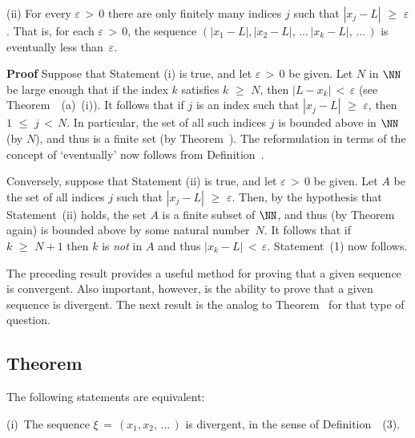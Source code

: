 \V

        (ii) For every ${\varepsilon}\,>\,0$ there are only finitely many indices $j$ such that $|x_{j}-L|\,\,{\geq}\,\,{\varepsilon}$.
    That is, for each ${\varepsilon}\,>\,0$, the sequence $(|x_{1}-L|, |x_{2}-L|, \,{\ldots}\,|x_{k}-L|,\,{\ldots}\,)$ is eventually less than~${\varepsilon}$.

    
\V

        {\bf Proof} Suppose that Statement (i) is true, and let ${\varepsilon}\,>\,0$ be given.
    Let $N$ in ${\NN}$ be large enough that if the index $k$ satisfies $k\,\,{\geq}\,\,N$, then $|L-x_{k}|\,<\,{\varepsilon}$ (see Theorem~~(a)~(i)).
    It follows that if $j$ is an index such that $|x_{j}-L|\,\,{\geq}\,\,{\varepsilon}$, then $1\,\,{\leq}\,\,j\,<\,N$.
    In particular, the set of all such indices $j$ is bounded above in ${\NN}$ (by $N$), and thus is a finite set (by Theorem~).
    The reformulation in terms of the concept of `eventually' now follows from Definition~.

        Conversely, suppose that Statement (ii) is true, and let ${\varepsilon}\,>\,0$ be given.
    Let $A$ be the set of all indices $j$ such that $|x_{j}-L|\,\,{\geq}\,\,{\varepsilon}$.
    Then, by the hypothesis that Statement~(ii) holds, the set $A$ is a finite subset of ${\NN}$,
    and thus (by Theorem~ again) is bounded above by some natural number~$N$.
    It follows that if $k\,\,{\geq}\,\,N+1$ then $k$ is {\em not} in $A$ and thus $|x_{k} - L|\,<\,{\varepsilon}$. Statement~(1) now follows.

\VV

        The preceding result provides a useful method for proving that a given sequence is convergent.
    Also important, however, is the ability to prove that a given sequence is divergent. The next result is the analog to Theorem~ for that type of question.

\V

            \subsection{\small{\bf Theorem}}
            \label{ThmC10.16}

\V


        The following statements are equivalent:

\V

        (i)\, The sequence ${\xi} \,=\, (x_{1},x_{2},\,{\ldots}\,)$ is divergent, in the sense of Definition~~(3).

